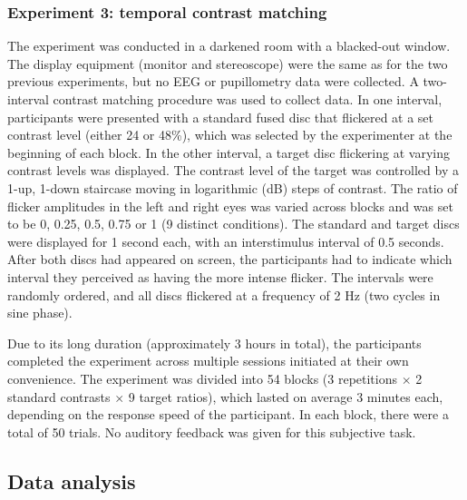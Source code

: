 \documentclass[
]{article}
\begin{document}
\hypertarget{experiment-3-temporal-contrast-matching}{%
\subsubsection{Experiment 3: temporal contrast matching}\label{experiment-3-temporal-contrast-matching}}

The experiment was conducted in a darkened room with a blacked-out window. The display equipment (monitor and stereoscope) were the same as for the two previous experiments, but no EEG or pupillometry data were collected. A two-interval contrast matching procedure was used to collect data. In one interval, participants were presented with a standard fused disc that flickered at a set contrast level (either 24 or 48\%), which was selected by the experimenter at the beginning of each block. In the other interval, a target disc flickering at varying contrast levels was displayed. The contrast level of the target was controlled by a 1-up, 1-down staircase moving in logarithmic (dB) steps of contrast. The ratio of flicker amplitudes in the left and right eyes was varied across blocks and was set to be 0, 0.25, 0.5, 0.75 or 1 (9 distinct conditions). The standard and target discs were displayed for 1 second each, with an interstimulus interval of 0.5 seconds. After both discs had appeared on screen, the participants had to indicate which interval they perceived as having the more intense flicker. The intervals were randomly ordered, and all discs flickered at a frequency of 2 Hz (two cycles in sine phase).

Due to its long duration (approximately 3 hours in total), the participants completed the experiment across multiple sessions initiated at their own convenience. The experiment was divided into 54 blocks (3 repetitions \(\times\) 2 standard contrasts \(\times\) 9 target ratios), which lasted on average 3 minutes each, depending on the response speed of the participant. In each block, there were a total of 50 trials. No auditory feedback was given for this subjective task.

\hypertarget{data-analysis}{%
\subsection{Data analysis}\label{data-analysis}}
\end{document}
